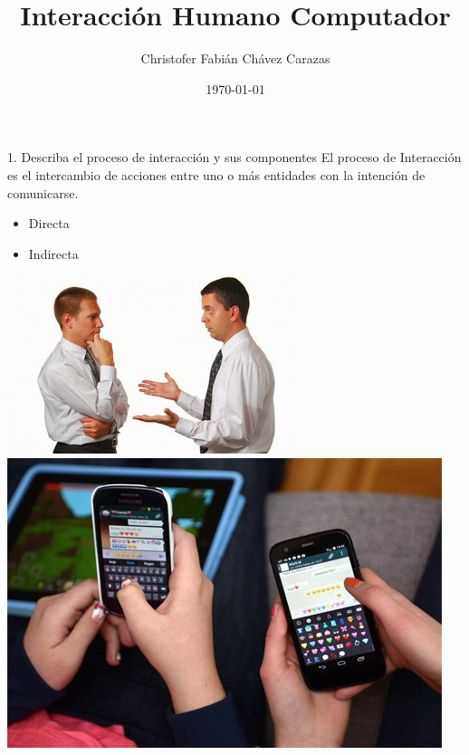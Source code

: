 \documentclass{beamer}
\title{Interacción Humano Computador}
\author{Christofer Fabián Chávez Carazas}
\institute[Universidad Nacional de San Agustín]
\date{\today}
\begin{document}
\begin{frame}
  \titlepage
\end{frame}

\begin{frame}
\begin{block}{1. Describa el proceso de interacción y sus componentes}
El proceso de Interacción es el intercambio de acciones entre uno o más entidades con la intención de comunicarse.
\begin{itemize}
    \item Directa
    \item Indirecta
\end{itemize}
\includegraphics[scale = 0.45]{1.jpg}
\vspace{0.5}
\includegraphics[scale = 0.3]{2.jpg}
\end{block}
\end{frame}
\end{document}
